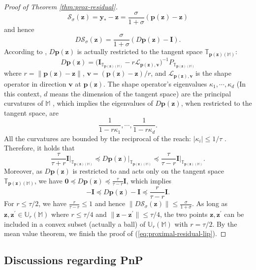 \documentclass{amsart} %
\def\eqref#1{equation~\ref{#1}}
\def\vzero{{\bm{0}}}
\def\vp{{\bm{p}}}
\def\vv{{\bm{v}}}
\def\vy{{\bm{y}}}
\def\vz{{\bm{z}}}
\def\mI{{\bm{I}}}
\def\sM{{\mathbb{M}}}
\def\sT{{\mathbb{T}}}
\def\sU{{\mathbb{U}}}
\def\cL{{\mathcal{L}}}
\def\cS{{\mathcal{S}}}
\newcommand{\Urt}{\sU_r(\sM)}
\theoremstyle{definition}
\theoremstyle{remark}
\renewcommand{\eqref}[1]{\textup{(\ref{#1})}}
\begin{document}
\begin{proof}[Proof of Theorem \ref{thm:prox-residual}]
\[ \cS_\sigma(\vz) = \vy_\ast-\vz = \frac{\sigma}{1+\sigma} (\vp(\vz)-\vz) \]
and hence
\[ D \cS_\sigma(\vz) = \frac{\sigma}{1+\sigma} (D\vp(\vz)-\mI). \]
According to \cite[Theorem C]{leobacher2021existence}, $D\vp(\vz)$ is actually restricted to the tangent space $\sT_{\vp(\vz)(\sM)}$:
\[ D\vp(\vz) = \Big(\mI_{\sT_{\vp(\vz)(\sM)}} - r \cL_{\vp(\vz),\vv} \Big)^{-1} P_{\sT_{\vp(\vz)(\sM)}} \]
where $r = \|\vp(\vz)-\vz\|$, $\vv = (\vp(\vz)-\vz)/r$, and $\cL_{\vp(\vz),\vv}$ is the shape operator in direction $\vv$ at $\vp(\vz)$. The shape operator's eigenvalues $\kappa_1,\cdots,\kappa_d$ (In this context, $d$ means the dimension of the tangent space) are the principal curvatures of $\sM$ \cite{do2016differential}, which implies the eigenvalues of $D\vp(\vz)$, when restricted to the tangent space, are
\[ \frac{1}{1-r\kappa_1}, \cdots, \frac{1}{1-r\kappa_d}. \]
All the curvatures are bounded by the reciprocal of the reach: $|\kappa_i| \leq 1/\tau$ \cite{aamari2019estimating}. Therefore, it holds that 
\[ \frac{\tau}{\tau+r}\mI \Big|_{\sT_{\vp(\vz)(\sM)}} \preceq D\vp(\vz) \Big|_{\sT_{\vp(\vz)(\sM)}} \preceq \frac{\tau}{\tau-r}\mI \Big|_{\sT_{\vp(\vz)(\sM)}}.\]
Moreover, as $D\vp(\vz)$ is restricted to and acts only on the tangent space $\sT_{\vp(\vz)(\sM)}$, we have $\vzero \preceq D\vp(\vz) \preceq \frac{\tau}{\tau-r}\mI$, which implies
\[ -\mI  \preceq D\vp(\vz) - \mI \preceq \frac{r}{\tau-r}\mI. \]
For $r \leq \tau/2$, we have $\frac{r}{\tau-r} \leq 1$ and hence $\|D \cS_\sigma(\vz)\| \leq \frac{\sigma}{1+\sigma}$. As long as $\vz,\vz^\prime \in \Urt$ where $r \leq \tau/4$ and $\|\vz - \vz^\prime\|\leq\tau/4$, the two points $\vz,\vz^\prime$ can be included in a convex subset (actually a ball) of $\Urt$ with $r=\tau/2$. By the mean value theorem, we finish the proof of \eqref{eq:proximal-residual-lip}.
\end{proof}




\subsection{Discussions regarding PnP}
\label{sec:app-pnp}
\end{document}
